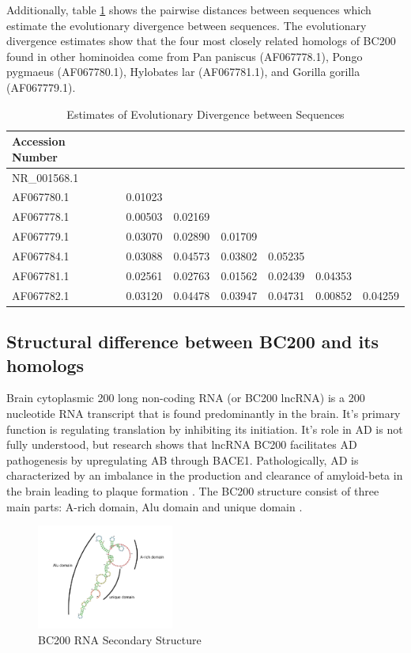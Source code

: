 \documentclass[conference]{IEEEtran}
\begin{document}
Additionally, table \ref{tbl:distances} shows the pairwise distances between sequences which estimate the evolutionary divergence between sequences. 
The evolutionary divergence estimates show that the four most closely related homologs of BC200 found in other hominoidea come from Pan paniscus (AF067778.1), Pongo pygmaeus (AF067780.1), Hylobates lar (AF067781.1), and Gorilla gorilla (AF067779.1). 

\begin{table}[h]
  \centering
  \caption{Estimates of Evolutionary Divergence between Sequences}
  \label{tbl:distances}
  \begin{tabular}{lcccccc}
    \toprule
    Accession Number \\
    \midrule
    NR\_001568.1 \\
    AF067780.1   & 0.01023 \\
    AF067778.1   & 0.00503 & 0.02169 \\
    AF067779.1   & 0.03070 & 0.02890 & 0.01709 \\ 
    AF067784.1   & 0.03088 & 0.04573 & 0.03802 & 0.05235 \\
    AF067781.1   & 0.02561 & 0.02763 & 0.01562 & 0.02439 & 0.04353 \\ 
    AF067782.1   & 0.03120 & 0.04478 & 0.03947 & 0.04731 & 0.00852 & 0.04259 \\
    \bottomrule
  \end{tabular}
\end{table}

\subsection{Structural difference between BC200 and its homologs}

Brain cytoplasmic 200 long non-coding RNA (or BC200 lncRNA) is a 200 nucleotide RNA transcript that is found predominantly in the brain. 
It's primary function is regulating translation by inhibiting its initiation. 
It's role in AD is not fully understood, but research shows that lncRNA BC200 facilitates AD pathogenesis by upregulating AB through BACE1. 
Pathologically, AD is characterized by an imbalance in the production and clearance of amyloid-beta in the brain leading to plaque formation \cite{li2018identification}.
The BC200 structure consist of three main parts: A-rich domain, Alu domain and unique domain \cite{jung2014rna}.

\begin{figure}[h]
  \centering
  \includegraphics[width=0.4\textwidth]{figs/rna-6.png}
  \caption{BC200 RNA Secondary Structure}
  \label{fig:bc200-structure}
\end{figure}
\end{document}

